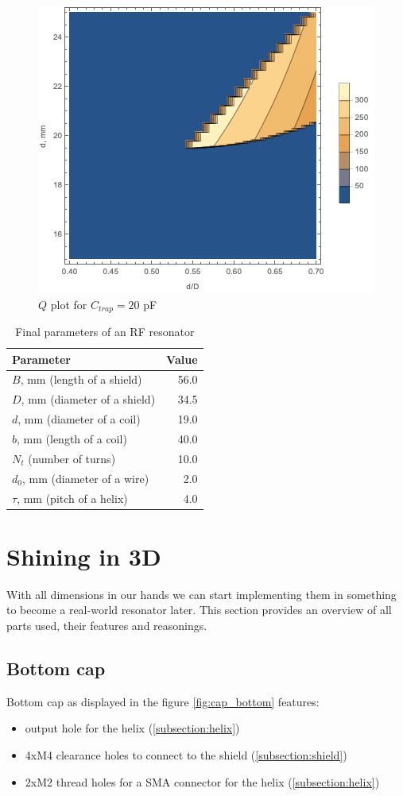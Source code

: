 \begin{figure}[!h]
\centering
\includegraphics[width=.78\textwidth]{images/q_plot_siverns_tex_20}
\caption{$Q$ plot for $C_{trap} = 20$ pF}
\label{fig:q_plot_20}
\end{figure}
\begin{table}[h]
\centering
\begin{tabular}{| l | r |}
	\hline
	Parameter & Value\\
	\hline \hline
	$B$, mm (length of a shield) & 56.0 \\
	\hline
	$D$, mm (diameter of a shield) & 34.5 \\
	\hline
	$d$, mm (diameter of a coil) & 19.0 \\
	\hline
	$b$, mm (length of a coil) & 40.0 \\
	\hline
	$N_{t}$ (number of turns) & 10.0 \\
	\hline
	$d_0$, mm (diameter of a wire) & 2.0 \\
	\hline
	$\tau$, mm (pitch of a helix) & 4.0 \\
	\hline
\end{tabular}
\caption{Final parameters of an RF resonator}
\label{tbl:final_parameters}
\end{table}

\section{Shining in 3D}
With all dimensions in our hands we can start implementing them in something to become a real-world resonator later. This section provides an overview of all parts used, their features and reasonings.
\clearpage
\subsection{Bottom cap}
\label{subsection:cap_bottom}
Bottom cap as displayed in the figure \ref{fig:cap_bottom} features:
\begin{itemize}
	\item output hole for the helix (\ref{subsection:helix})
	\item 4xM4 clearance holes to connect to the shield (\ref{subsection:shield})
	\item 2xM2 thread holes for a SMA connector for the helix (\ref{subsection:helix})
\end{itemize}

